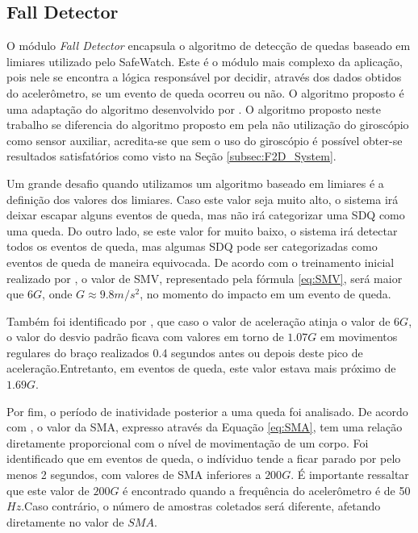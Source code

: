 \subsection{Fall Detector}
\label{subsec:fall_detector}
O módulo \textit{Fall Detector} encapsula o algoritmo de detecção de quedas baseado em limiares utilizado pelo SafeWatch. Este é o módulo mais complexo da aplicação, pois nele se encontra a lógica responsável por decidir, através dos dados obtidos do acelerômetro, se um evento de queda ocorreu ou não. O algoritmo proposto é uma adaptação do algoritmo desenvolvido por \cite{hsieh2014wrist}. O algoritmo proposto neste trabalho se diferencia do algoritmo proposto em \cite{hsieh2014wrist} pela não utilização do giroscópio como sensor auxiliar, acredita-se que sem o uso do giroscópio é possível obter-se resultados satisfatórios como visto na Seção \ref{subsec:F2D_System}. 

Um grande desafio quando utilizamos um algoritmo baseado em limiares é a definição dos valores dos limiares. Caso este valor seja muito alto, o sistema irá deixar escapar alguns eventos de queda, mas não irá categorizar uma \ac{SDQ} como uma queda.  Do outro lado, se este valor for muito baixo, o sistema irá detectar todos os eventos de queda, mas algumas \ac{SDQ} pode ser categorizadas como eventos de queda de maneira equivocada. De acordo com o treinamento inicial realizado por \cite{hsieh2014wrist}, o valor de \ac{SMV}, representado pela fórmula \ref{eq:SMV}, será maior que $6G$, onde $G \approx 9.8 m/s^2$,  no momento do impacto em um evento de queda. 

Também foi identificado por \cite{hsieh2014wrist}, que caso o valor de aceleração atinja o valor de $6G$, o valor do desvio padrão ficava com valores em torno de $1.07G$  em movimentos regulares do braço realizados 0.4 segundos antes ou depois deste pico de aceleração.Entretanto, em eventos de queda, este valor estava mais próximo de $1.69G$. 

Por fim, o período de inatividade posterior a uma queda foi analisado. De acordo com \cite{hsieh2014wrist}, o valor da \ac{SMA}, expresso através da Equação \ref{eq:SMA}, tem uma relação diretamente proporcional com o nível de movimentação de um corpo. Foi identificado que em eventos de queda, o indíviduo tende a ficar parado por pelo menos 2 segundos, com valores de SMA inferiores a $200G$. É importante ressaltar que este valor de $200G$ é encontrado quando a frequência do acelerômetro é de 50 $Hz$.Caso contrário, o número de amostras coletados será diferente, afetando diretamente no valor de $SMA$. 

